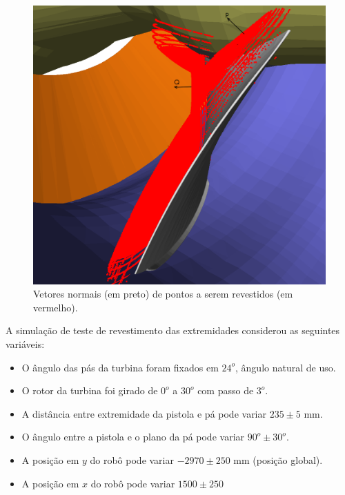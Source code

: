 \begin{figure}[!ht]
	\centering	
	\includegraphics[width=.5\columnwidth]{figs/normal.png}
	\caption{Vetores normais (em preto) de pontos a serem revestidos (em
	vermelho).}
	\label{fig::normal}
\end{figure}

A simulação de teste de revestimento das extremidades considerou as seguintes
variáveis: 

\begin{itemize}
  \item O ângulo das pás da turbina foram fixados em $24^o$, ângulo natural de
  uso.
  \item O rotor da turbina foi girado de $0^o$ a $30^o$ com passo de $3^o$.
  \item A distância entre extremidade da pistola e pá pode variar $235
  \pm 5$ mm.
  \item O ângulo entre a pistola e o plano da pá pode variar $90^o \pm
  30^o$.
  \item A posição em $y$ do robô pode variar $-2970 \pm 250$ mm (posição
  global).
  \item A posição em $x$ do robô pode variar $1500 \pm 250$
\end{itemize}
